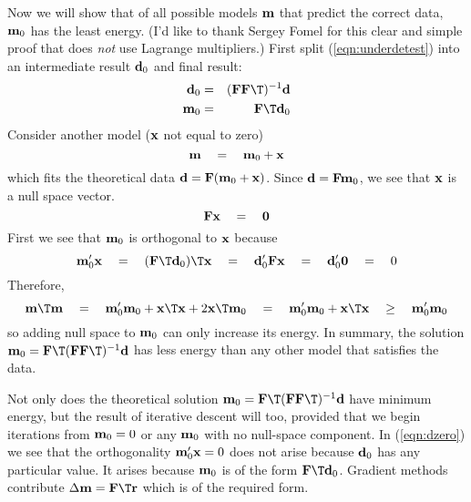 \par
Now we will show that of all possible models $\bold m$ that
predict the correct data, $\bold m_0$ has the least energy.
(I'd like to thank Sergey Fomel for this clear and simple proof
that does {\em  not} use Lagrange multipliers.)
First split (\ref{eqn:underdetest}) into an intermediate
result $\bold d_0$ and final result:
\begin{eqnarray}
        \bold d_0 &=& (\bold F \bold F\T)^{-1} \bold d
	\\
        \bold m_0 &=& \bold F\T \bold d_0
\end{eqnarray}
Consider another model ($\bold x$ not equal to zero)
\begin{equation}
        \bold m \quad =\quad \bold m_0 + \bold x
\end{equation}
which fits the theoretical data
$\bold d = \bold F(\bold m_0+\bold x)$.
Since
$\bold d=\bold F\bold m_0$,
we see
that $\bold x$ is a null space vector.
\begin{equation}
        \bold F \bold x \quad =\quad \bold 0
\end{equation}
First we see that $\bold m_0$ is orthogonal to $\bold x$ because
\begin{equation}
         \bold m_0' \bold x \eq
         (\bold F\T \bold d_0)\T \bold x \eq
         \bold d_0' \bold F \bold x \eq
         \bold d_0' \bold 0 \eq 0
	\label{eqn:dzero}
\end{equation}
Therefore,
\begin{equation}
\bold m\T \bold m \eq
\bold m_0' \bold m_0 + \bold x\T\bold x + 2 \bold x\T \bold m_0 \eq
\bold m_0' \bold m_0 + \bold x\T\bold x \quad\ge\quad \bold m_0' \bold m_0 
\end{equation}
so adding null space to $\bold m_0$ can only increase its energy.
In summary,
the solution
$\bold m_0 = \bold F\T (\bold F \bold F\T)^{-1} \bold d$
has less energy than any other model that satisfies the data.

\par
Not only does the theoretical solution
$\bold m_0 = \bold F\T (\bold F \bold F\T)^{-1} \bold d$
have minimum energy,
but the result of iterative descent will too,
provided that we begin iterations from $\bold m_0=0$ or any $\bold m_0$
with no null-space component.
In (\ref{eqn:dzero}) we see that the 
orthogonality $\bold m_0'\bold x=0$
does not arise because $\bold d_0$ has any particular value.
It arises because $\bold m_0$ is of the form $\bold F\T\bold d_0$.
Gradient methods contribute $\Delta\bold m =\bold F\T \bold r$
which is of the required form.

